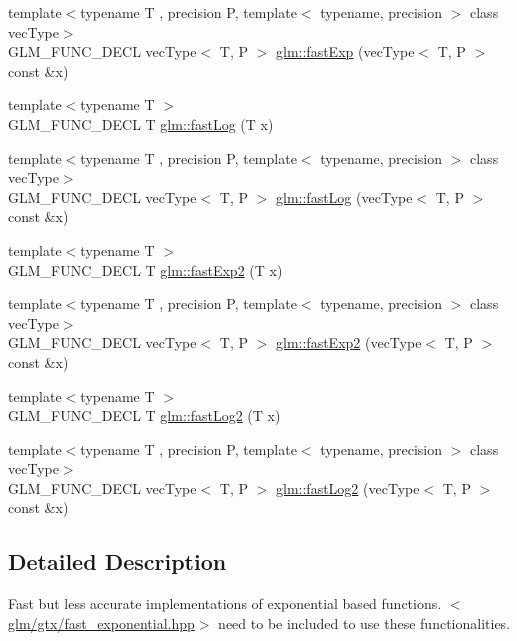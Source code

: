\begin{DoxyCompactItemize}
{\footnotesize template$<$typename T , precision P, template$<$ typename, precision $>$ class vec\-Type$>$ }\\G\-L\-M\-\_\-\-F\-U\-N\-C\-\_\-\-D\-E\-C\-L vec\-Type$<$ T, P $>$ \hyperlink{group__gtx__fast__exponential_ga4faf0b61115de36efcf47c4ecb55a5fa}{glm\-::fast\-Exp} (vec\-Type$<$ T, P $>$ const \&x)
\item 
{\footnotesize template$<$typename T $>$ }\\G\-L\-M\-\_\-\-F\-U\-N\-C\-\_\-\-D\-E\-C\-L T \hyperlink{group__gtx__fast__exponential_gae1bdc97b7f96a600e29c753f1cd4388a}{glm\-::fast\-Log} (T x)
\item 
{\footnotesize template$<$typename T , precision P, template$<$ typename, precision $>$ class vec\-Type$>$ }\\G\-L\-M\-\_\-\-F\-U\-N\-C\-\_\-\-D\-E\-C\-L vec\-Type$<$ T, P $>$ \hyperlink{group__gtx__fast__exponential_ga789abcbc34d08008d2f5a4547dd6e5e3}{glm\-::fast\-Log} (vec\-Type$<$ T, P $>$ const \&x)
\item 
{\footnotesize template$<$typename T $>$ }\\G\-L\-M\-\_\-\-F\-U\-N\-C\-\_\-\-D\-E\-C\-L T \hyperlink{group__gtx__fast__exponential_ga0af50585955eb14c60bb286297fabab2}{glm\-::fast\-Exp2} (T x)
\item 
{\footnotesize template$<$typename T , precision P, template$<$ typename, precision $>$ class vec\-Type$>$ }\\G\-L\-M\-\_\-\-F\-U\-N\-C\-\_\-\-D\-E\-C\-L vec\-Type$<$ T, P $>$ \hyperlink{group__gtx__fast__exponential_ga9e6219327b7a33077dbec7620d981fff}{glm\-::fast\-Exp2} (vec\-Type$<$ T, P $>$ const \&x)
\item 
{\footnotesize template$<$typename T $>$ }\\G\-L\-M\-\_\-\-F\-U\-N\-C\-\_\-\-D\-E\-C\-L T \hyperlink{group__gtx__fast__exponential_ga6e98118685f6dc9e05fbb13dd5e5234e}{glm\-::fast\-Log2} (T x)
\item 
{\footnotesize template$<$typename T , precision P, template$<$ typename, precision $>$ class vec\-Type$>$ }\\G\-L\-M\-\_\-\-F\-U\-N\-C\-\_\-\-D\-E\-C\-L vec\-Type$<$ T, P $>$ \hyperlink{group__gtx__fast__exponential_gabc46086fe6636b8be87f09e6c5d2bb58}{glm\-::fast\-Log2} (vec\-Type$<$ T, P $>$ const \&x)
\end{DoxyCompactItemize}


\subsection{Detailed Description}
Fast but less accurate implementations of exponential based functions. $<$\hyperlink{fast__exponential_8hpp}{glm/gtx/fast\-\_\-exponential.\-hpp}$>$ need to be included to use these functionalities. 

